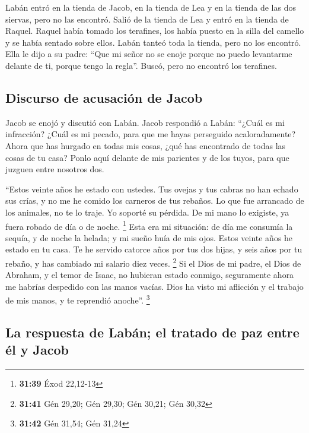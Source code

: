 \begin{paracol}{2}
 Labán entró en la tienda de Jacob, en la tienda de Lea y
en la tienda de las dos siervas, pero no las encontró. Salió de la
tienda de Lea y entró en la tienda de Raquel.  Raquel
había tomado los terafines, los había puesto en la silla del camello y
se había sentado sobre ellos. Labán tanteó toda la tienda, pero no los
encontró.  Ella le dijo a su padre: ``Que mi señor no se
enoje porque no puedo levantarme delante de ti, porque tengo la regla''.
Buscó, pero no encontró los terafines.

\hypertarget{discurso-de-acusaciuxf3n-de-jacob}{%
\subsection{Discurso de acusación de
Jacob}\label{discurso-de-acusaciuxf3n-de-jacob}}

 Jacob se enojó y discutió con Labán. Jacob respondió a
Labán: ``¿Cuál es mi infracción? ¿Cuál es mi pecado, para que me hayas
perseguido acaloradamente?  Ahora que has hurgado en
todas mis cosas, ¿qué has encontrado de todas las cosas de tu casa?
Ponlo aquí delante de mis parientes y de los tuyos, para que juzguen
entre nosotros dos.

 ``Estos veinte años he estado con ustedes. Tus ovejas y
tus cabras no han echado sus crías, y no me he comido los carneros de
tus rebaños.  Lo que fue arrancado de los animales, no te
lo traje. Yo soporté su pérdida. De mi mano lo exigiste, ya fuera robado
de día o de noche. \footnote{\textbf{31:39} Éxod 22,12-13}
 Esta era mi situación: de día me consumía la sequía, y
de noche la helada; y mi sueño huía de mis ojos.  Estos
veinte años he estado en tu casa. Te he servido catorce años por tus dos
hijas, y seis años por tu rebaño, y has cambiado mi salario diez veces.
\footnote{\textbf{31:41} Gén 29,20; Gén 29,30; Gén 30,21; Gén 30,32}
 Si el Dios de mi padre, el Dios de Abraham, y el temor
de Isaac, no hubieran estado conmigo, seguramente ahora me habrías
despedido con las manos vacías. Dios ha visto mi aflicción y el trabajo
de mis manos, y te reprendió anoche''. \footnote{\textbf{31:42} Gén
  31,54; Gén 31,24}

\hypertarget{la-respuesta-de-labuxe1n-el-tratado-de-paz-entre-uxe9l-y-jacob}{%
\subsection{La respuesta de Labán; el tratado de paz entre él y
Jacob}\label{la-respuesta-de-labuxe1n-el-tratado-de-paz-entre-uxe9l-y-jacob}}


\end{paracol}
